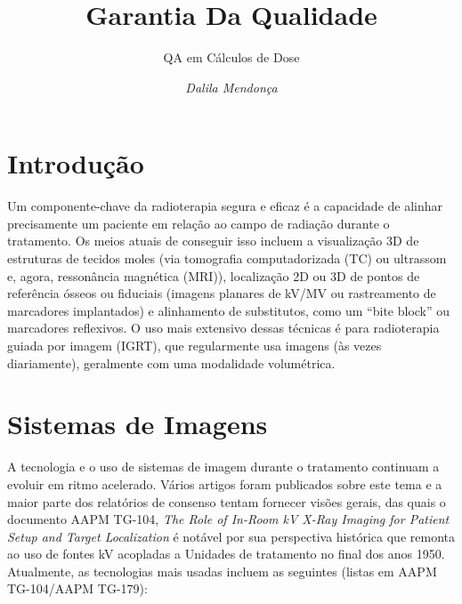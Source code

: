 \documentclass[11pt,a4paper]{article}
\title{\LobsterTwo\Huge{Garantia Da Qualidade}}
\author{\LobsterTwo\Large{QA em Cálculos de Dose}\nocite{*}}
\date{\LobsterTwo\textit{Dalila Mendonça}}
\begin{document}
	\maketitle

\section{Introdução}

    Um componente-chave da radioterapia segura e eficaz é a capacidade de alinhar precisamente um paciente em relação ao campo de radiação durante o tratamento. Os meios atuais de conseguir isso incluem a visualização 3D de estruturas de tecidos moles (via tomografia computadorizada (TC) ou ultrassom e, agora,  ressonância magnética (MRI)), localização 2D ou 3D de pontos de referência ósseos ou fiduciais (imagens planares de kV/MV ou rastreamento de marcadores implantados) e alinhamento de substitutos, como um ``bite block'' ou marcadores reflexivos. O uso mais extensivo dessas técnicas é para radioterapia guiada por imagem (IGRT), que regularmente usa imagens (às vezes diariamente), geralmente com uma modalidade volumétrica. 

\section{Sistemas de Imagens}

    A tecnologia e o uso de sistemas de imagem durante o tratamento continuam a evoluir em ritmo acelerado. Vários artigos foram publicados sobre este tema e a maior parte dos relatórios de consenso tentam fornecer visões gerais, das quais o documento AAPM TG-104, \textit{The Role of In-Room kV X-Ray Imaging for Patient Setup and Target Localization} é notável por sua perspectiva histórica que remonta ao uso de fontes kV acopladas a Unidades de tratamento  no final dos anos 1950. Atualmente, as tecnologias mais usadas incluem as seguintes (listas em AAPM TG-104/AAPM TG-179):
\end{document}
